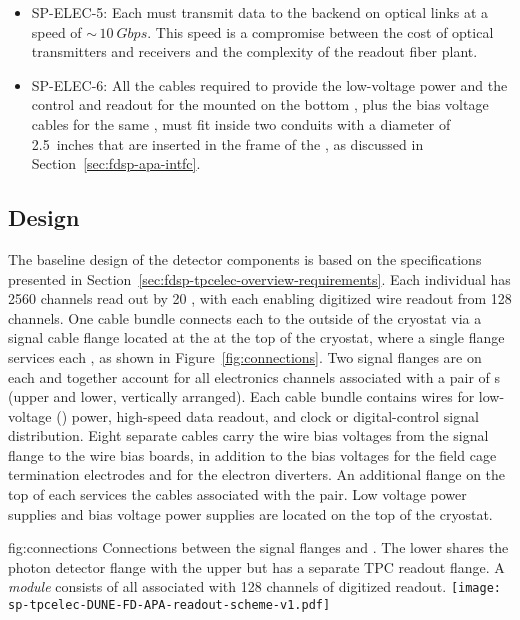 \begin{itemize}
\item SP-ELEC-5: Each  must transmit data to the 
backend on optical links at a speed of $\sim\,\SI{10}{Gbps}$. This speed 
is a compromise between the cost of optical transmitters and
receivers and the complexity of the readout fiber plant.

\item SP-ELEC-6: All the cables required to provide the low-voltage power
and the control and readout for the  mounted on
the bottom , plus the bias voltage cables for
the same , must fit inside two conduits with a
diameter of \SI{2.5}{inches} that are inserted in the frame of
the , as discussed in Section~\ref{sec:fdsp-apa-intfc}.
\end{itemize}

\subsection{Design}
\label{sec:fdsp-tpcelec-overview-design}

The baseline design of the  detector components is
based on the specifications %
presented in Section~\ref{sec:fdsp-tpcelec-overview-requirements}. 
Each individual  has \num{2560} channels read out by \num{20} 
, with each  enabling digitized wire readout 
from \num{128} channels. One cable bundle connects each  to
the outside of the cryostat via a  signal cable flange located 
at the  \fdth at the top of the cryostat, where a single flange 
services each , as shown in Figure~\ref{fig:connections}. 
Two  signal flanges are on each \fdth and together account for 
all electronics channels associated with a pair of s (upper 
and lower, vertically arranged). Each cable bundle contains wires for 
low-voltage () power, high-speed data readout, and clock or 
digital-control signal distribution. Eight separate cables carry the 
 wire bias voltages from the signal flange to the  
wire bias boards, in addition to the bias voltages for the field cage 
termination electrodes and for the electron diverters. An additional 
flange on the top of each \fdth services the  cables associated 
with the  pair. Low voltage power supplies and bias voltage
power supplies are located on the top of the cryostat. 

\begin{dunefigure}
{fig:connections}
{Connections between the signal flanges and . The lower 
 shares the photon detector flange with the 
upper  but has a separate TPC readout flange. 
A \textit{ module} consists of all  
associated with \num{128} channels of digitized readout.}
\texttt{[image: sp-tpcelec-DUNE-FD-APA-readout-scheme-v1.pdf]}
\end{dunefigure}

